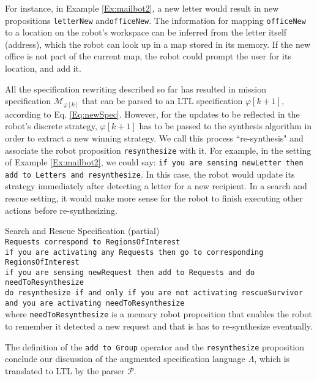 For instance, in Example \ref{Ex:mailbot2}, a new letter would result in new propositions \texttt{letterNew} and\texttt{officeNew}. The information for mapping \texttt{officeNew} to a location on the robot's workspace can be inferred from the letter itself (address), which the robot can look up in a map stored in its memory. If the new office is not part of the current map, the robot could prompt the user for its location, and add it.

All the specification rewriting described so far has resulted in mission specification $\mathcal{M}_{\varphi [k]}$ that can be parsed to an LTL specification $\varphi [k+1]$, according to Eq. \eqref{Eq:newSpec}. However, for the updates to be reflected in the robot's discrete strategy, $\varphi [k+1]$ has to be passed to the synthesis algorithm in order to extract a new winning strategy. We call this process ``re-synthesis" and associate the robot proposition \texttt{resynthesize} with it. For example, in the setting of Example \ref{Ex:mailbot2}, we could say:
\texttt{if you are sensing newLetter then add to Letters and resynthesize}. In this case, the robot would update its strategy immediately after detecting a letter for a new recipient. In a search and rescue setting, it would make more sense for the robot to finish executing other actions before re-synthesizing.

\begin{myExample}\label{Ex:SnS} Search and Rescue Specification (partial)\\
	\texttt{Requests correspond to RegionsOfInterest}\\
	\texttt{if you are activating any Requests then go to corresponding RegionsOfInterest}\\
	\texttt{if you are sensing newRequest then add to Requests and do needToResynthesize}\\
	\texttt{do resynthesize if and only if you are not activating rescueSurvivor and you are activating needToResynthesize}\\
	where \texttt{needToResynthesize} is a memory robot proposition that enables the robot to remember it detected a new request and that is has to re-synthesize eventually.
\end{myExample}

The definition of the \texttt{add to Group} operator and the \texttt{resynthesize} proposition conclude our discussion of the augmented specification language $\Lambda$, which is translated to LTL by the parser $\mathcal{P}$. 

